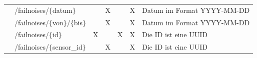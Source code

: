 \begin{landscape}
\begin{table}[H]
\begin{longtable}{lllllll}
                                      & /failnoises/$\{$datum$\}$           &  & X & & X & Datum im Format YYYY-MM-DD     \\
                                      & /failnoises/$\{$von$\}$/$\{$bis$\}$       &  & X & & X & Datum im Format YYYY-MM-DD     \\
                                      & /failnoises/$\{$id$\}$              & X & & X & X & Die ID ist eine UUID          \\
                                      & /failnoises/$\{$sensor\_id$\}$      &  & X & & X & Die ID ist eine UUID           \\ \midrule
    \end{longtable}
  \end{table}

  \newpage


\end{landscape}
